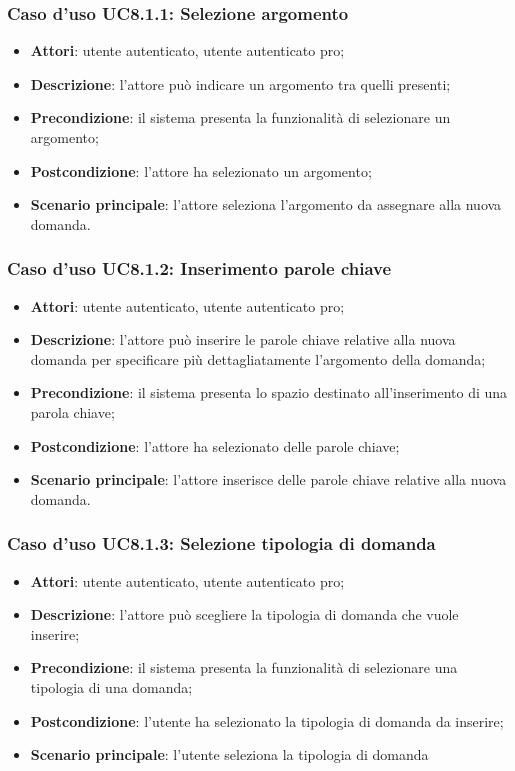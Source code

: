 	\subsubsection{Caso d'uso UC8.1.1: Selezione argomento}
	\begin{itemize}
		\item
			\textbf{Attori}: utente autenticato, utente autenticato pro;
		\item
			\textbf{Descrizione}: l'attore può indicare un argomento tra quelli presenti;
		\item		
			\textbf{Precondizione}: il sistema presenta la funzionalità di selezionare un argomento;
		\item
			\textbf{Postcondizione}: l'attore ha selezionato un argomento;
		\item
			\textbf{Scenario principale}: l'attore seleziona l'argomento da assegnare alla nuova domanda.		
	\end{itemize}
		
	\subsubsection{Caso d'uso UC8.1.2: Inserimento parole chiave}
	\begin{itemize}
		\item
			\textbf{Attori}: utente autenticato, utente autenticato pro;
		\item
			\textbf{Descrizione}: l'attore può inserire le parole chiave relative alla nuova domanda per specificare più dettagliatamente l'argomento della domanda;
		\item		
			\textbf{Precondizione}: il sistema presenta lo spazio destinato all'inserimento di una parola chiave;
		\item
			\textbf{Postcondizione}: l'attore ha selezionato delle parole chiave;
		\item
			\textbf{Scenario principale}: l'attore inserisce delle parole chiave relative alla nuova domanda.	
	\end{itemize}


	\subsubsection{Caso d'uso UC8.1.3: Selezione tipologia di domanda}
	\begin{itemize}
		\item
			\textbf{Attori}: utente autenticato, utente autenticato pro;
		\item
			\textbf{Descrizione}: l'attore può scegliere la tipologia di domanda che vuole inserire;
		\item		
			\textbf{Precondizione}: il sistema presenta la funzionalità di selezionare una tipologia di una domanda;
		\item
			\textbf{Postcondizione}: l'utente ha selezionato la tipologia di domanda da inserire;
		\item 
			\textbf{Scenario principale}: l'utente seleziona la tipologia di domanda
	\end{itemize}

